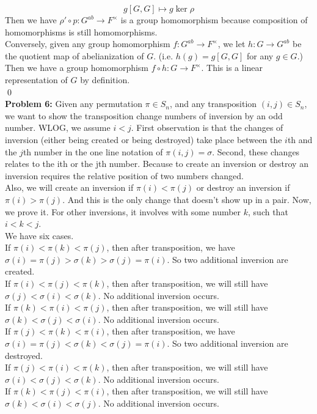 \documentclass[12pt]{amsart}
\begin{document}
\[g[G,G]\mapsto g\ker\rho\]
Then we have $\rho'\circ p:G^{ab}\to F^\times$ is a group homomorphism because composition of homomorphisms is still homomorphisms.\\
Conversely, given any group homomorphism $f:G^{ab}\to F^\times$, we let $h:G\to G^{ab}$ be the quotient map of abelianization of $G$. (i.e. $h(g)=g[G,G]$ for any $g\in G$.)
Then we have a group homomorphism $f\circ h:G\to F^\times$. This is a linear representation of $G$ by definition.
\\\qed\\
\textbf{Problem  6:}
Given any permutation $\pi\in S_n$, and any transposition $(i,j)\in S_n$, we want to show the transposition change numbers of inversion by an odd number. WLOG, we assume $i<j$. First observation is that the changes of inversion (either being created or being destroyed) take place between the $i$th and the $j$th number in the one line notation of $\pi(i,j)=\sigma$. Second, these changes relates to the ith or the jth number. Because to create an inversion or destroy an inversion requires the relative position of two numbers changed.\\
Also, we will create an inversion if $\pi(i)<\pi(j)$ or destroy an inversion if $\pi(i)>\pi(j)$. And this is the only change that doesn't show up in a pair. Now, we prove it. For other inversions, it involves with some number $k$, such that $i<k<j$.\\
We have six cases.\\
If $\pi(i)<\pi(k)<\pi(j)$, then after transposition, we have $\sigma(i)=\pi(j)>\sigma(k)>\sigma(j)=\pi(i)$. So two additional inversion are created.\\
If $\pi(i)<\pi(j)<\pi(k)$, then after transposition, we will still have $\sigma(j)<\sigma(i)<\sigma(k)$. No additional inversion occurs.\\
If $\pi(k)<\pi(i)<\pi(j)$, then after transposition, we will still have $\sigma(k)<\sigma(j)<\sigma(i)$. No additional inversion occurs.\\
If $\pi(j)<\pi(k)<\pi(i)$, then after transposition, we have $\sigma(i)=\pi(j)<\sigma(k)<\sigma(j)=\pi(i)$. So two additional inversion are destroyed.\\
If $\pi(j)<\pi(i)<\pi(k)$, then after transposition, we will still have $\sigma(i)<\sigma(j)<\sigma(k)$. No additional inversion occurs.\\
If $\pi(k)<\pi(j)<\pi(i)$, then after transposition, we will still have $\sigma(k)<\sigma(i)<\sigma(j)$. No additional inversion occurs.\\
\end{document}
